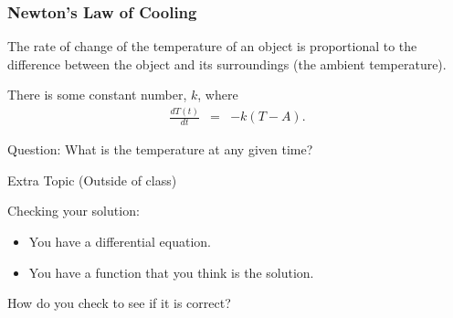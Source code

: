 \begin{frame}
  \frametitle{Newton's Law of Cooling}

  The rate of change of the temperature of an object is proportional
  to the difference between the object and its surroundings (the
  ambient temperature).

    There is some constant number, $k$, where 
    \begin{eqnarray*}
      \frac{dT(t)}{dt} & = & -k (T-A).
    \end{eqnarray*}

    Question: What is the temperature at any given time?

\end{frame}


\begin{frame}{Extra Topic (Outside of class) }

  Checking your solution:
  \begin{itemize}
  \item You have a differential equation.
  \item You have a function that you think is the solution.
  \end{itemize}

  How do you check to see if it is correct?


  
\end{frame}


